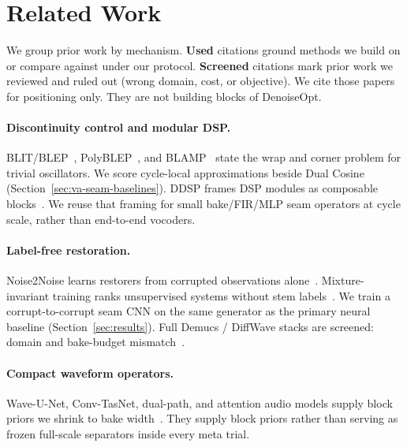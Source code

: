 \section{Related Work}
\label{sec:related_work}

We group prior work by mechanism.
\textbf{Used} citations ground methods we build on or compare against under our protocol.
\textbf{Screened} citations mark prior work we reviewed and ruled out (wrong domain, cost, or objective).
We cite those papers for positioning only.
They are not building blocks of DenoiseOpt.

\paragraph{Discontinuity control and modular DSP.}
BLIT/BLEP~\cite{stilson1996}, PolyBLEP~\cite{nam2009polyblep}, and BLAMP~\cite{esqueda2016blamp} state the wrap and corner problem for trivial oscillators.
We score cycle-local approximations beside Dual Cosine (Section~\ref{sec:va-seam-baselines}).
DDSP frames DSP modules as composable blocks~\cite{engel2020}.
We reuse that framing for small bake/FIR/MLP seam operators at cycle scale, rather than end-to-end vocoders.

\paragraph{Label-free restoration.}
Noise2Noise learns restorers from corrupted observations alone~\cite{lehtinen2018,kashyap2021n2n}.
Mixture-invariant training ranks unsupervised systems without stem labels~\cite{wisdom2020}.
We train a corrupt-to-corrupt seam CNN on the same generator as the primary neural baseline (Section~\ref{sec:results}).
Full Demucs / DiffWave stacks are screened: domain and bake-budget mismatch~\cite{dfossez2019,kong2021}.

\paragraph{Compact waveform operators.}
Wave-U-Net, Conv-TasNet, dual-path, and attention audio models supply block priors we shrink to bake width~\cite{stoller2018,luo2019,luo2020dprnn,subakan2021,ronneberger2015,he2016resnet,vaswani2017}.
They supply block priors rather than serving as frozen full-scale separators inside every meta trial.

